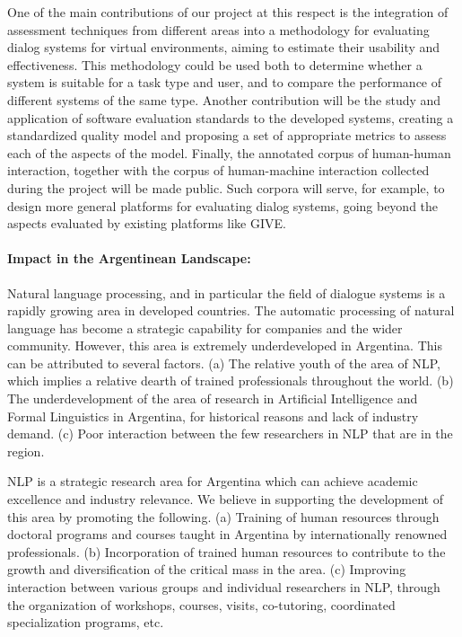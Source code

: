 One of the main contributions of our project at this respect is the
integration of assessment techniques from different areas into a methodology for
evaluating dialog systems for virtual environments, aiming to estimate their
usability and effectiveness. This methodology could be used both to determine
whether a system is suitable for a task type and user, and to compare the
performance of different systems of the same type.
Another contribution will be the study and application of software evaluation standards
to the developed systems, creating a standardized quality model and proposing
a set of appropriate metrics to assess each of the aspects of the model. 
Finally, the annotated corpus of human-human interaction, together with the corpus of
human-machine interaction collected during the project will be made public. Such
corpora will serve, for example, to design more general platforms for evaluating
dialog systems, going beyond the aspects evaluated by existing
platforms like GIVE.

\paragraph{Impact in the Argentinean Landscape:} 
Natural language processing, and in particular the field of dialogue
systems is a rapidly growing area in developed countries. The automatic
processing of natural language has become a strategic capability for companies 
and the wider community. However, this area is extremely
underdeveloped in Argentina. This can be attributed to several factors. (a) The
relative youth of the area of NLP, which implies a relative dearth of trained
professionals throughout the world. (b) The underdevelopment of the area
of research in Artificial Intelligence and Formal Linguistics in Argentina, 
for historical reasons and lack of industry demand. (c) Poor interaction
between the few researchers in NLP that are in the region. 

NLP is a strategic research area for Argentina which can
achieve academic excellence and industry relevance. We believe in supporting the
development of this area by promoting the following. (a) Training of human
resources through doctoral programs and courses taught in Argentina by
internationally renowned professionals. (b) Incorporation of trained human
resources to contribute to the growth and diversification of the critical mass
in the area. (c) Improving interaction between various groups and
individual researchers in NLP, through the organization of workshops, courses,
visits, co-tutoring, coordinated specialization programs, etc.


